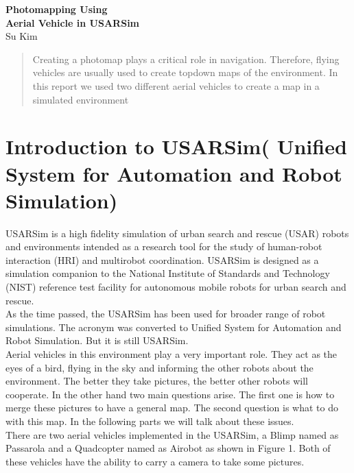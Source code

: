 \documentclass{article}
\begin{document}
\begin{flushleft}


\end{flushleft}
\begin{center}
\begin{Large}
\textbf{Photomapping Using\\ Aerial Vehicle in USARSim}\\
Su Kim

\end{Large}
\end{center}
\begin{abstract}
 Creating a photomap plays a critical role in navigation. Therefore, flying vehicles
are usually used to create topdown maps of the environment. In this report we used two
different aerial vehicles to create a map in a simulated environment
\end{abstract}

\section{Introduction to USARSim( Unified System for Automation and Robot Simulation)}

USARSim is a high fidelity simulation of urban search and rescue (USAR) robots and environments intended as a research tool for the study of human-robot interaction (HRI) and multirobot coordination. USARSim is designed as a simulation companion to the National Institute of Standards and Technology (NIST) reference test facility for autonomous mobile robots for urban search and rescue\cite{usarsim}.\\
As the time passed, the USARSim has been used for broader range of robot simulations. The acronym was converted to Unified System for Automation and Robot Simulation. But it is still USARSim.\\

Aerial vehicles in this environment play a very important role\cite{survey, shams2}. They act as the eyes of a bird, flying in the sky and informing the other robots about the environment. The better they take pictures, the better other robots will cooperate. In the other hand two main questions arise. The first one is how to merge these pictures to have a general map. The second question is what to do with this map. In the following parts we will talk about these issues.\\

There are two aerial vehicles implemented in the USARSim, a Blimp named as Passarola and a Quadcopter named as Airobot as shown in Figure 1. Both of these vehicles have the ability to carry a camera to take some pictures. \\
\end{document}
